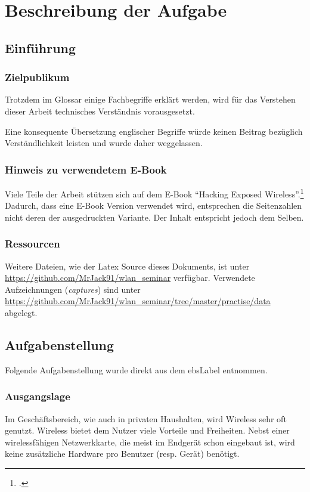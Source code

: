 \chapter{Beschreibung der Aufgabe}

\section{Einführung}
\subsection{Zielpublikum}
Trotzdem im Glossar einige Fachbegriffe erklärt werden, wird für das Verstehen dieser Arbeit technisches Verständnis vorausgesetzt.

Eine konsequente Übersetzung englischer Begriffe würde keinen Beitrag bezüglich Verständlichkeit leisten und wurde daher weggelassen.

\subsection{Hinweis zu verwendetem E-Book}
Viele Teile der Arbeit stützen sich auf dem E-Book "`Hacking Exposed Wireless"'.\footcite{WrightCache201503}
Dadurch, dass eine E-Book Version verwendet wird, entsprechen die Seitenzahlen nicht deren der ausgedruckten Variante.
Der Inhalt entspricht jedoch dem Selben.

\subsection{Ressourcen}
Weitere Dateien, wie der Latex Source dieses Dokuments, ist unter \url{https://github.com/MrJack91/wlan_seminar} verfügbar.
Verwendete Aufzeichnungen (\textit{captures}) sind unter \url{https://github.com/MrJack91/wlan_seminar/tree/master/practise/data} abgelegt.

\section{Aufgabenstellung}
Folgende Aufgabenstellung wurde direkt aus dem \gls{ebsLabel} entnommen.

\subsection{Ausgangslage}
Im Geschäftsbereich, wie auch in privaten Haushalten, wird Wireless sehr oft genutzt.
Wireless bietet dem Nutzer viele Vorteile und Freiheiten. Nebst einer wirelessfähigen Netzwerkkarte, die meist im Endgerät schon eingebaut ist, wird keine zusätzliche Hardware pro Benutzer (resp. Gerät) benötigt.

